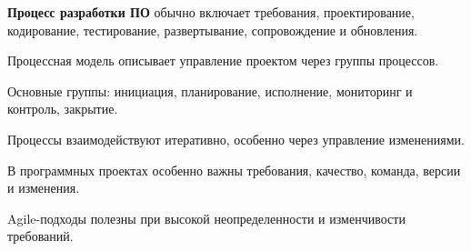 \textbf{Процесс разработки ПО} обычно включает требования, проектирование, кодирование, тестирование, развертывание, сопровождение и обновления.

\begin{important}
    \item Процессная модель описывает управление проектом через группы процессов.
    \item Основные группы: инициация, планирование, исполнение, мониторинг и контроль, закрытие.
    \item Процессы взаимодействуют итеративно, особенно через управление изменениями.
    \item В программных проектах особенно важны требования, качество, команда, версии и изменения.
    \item Agile-подходы полезны при высокой неопределенности и изменчивости требований.
\end{important}
